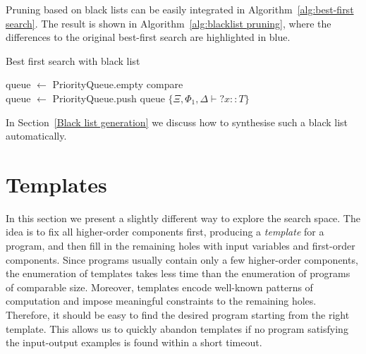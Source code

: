Pruning based on black lists can be easily integrated in Algorithm~\ref{alg:best-first search}. The result is shown in Algorithm~\ref{alg:blacklist pruning}, where the differences to the original best-first search are highlighted in blue.

\begin{algorithm}
\caption{Best first search with black list\label{alg:blacklist pruning}}

queue $\gets$ PriorityQueue.empty compare\\
queue $\gets$ PriorityQueue.push queue $\{\Xi, \Phi_1, \Delta \vdash {?x} :: T\}$\\

\end{algorithm}

In Section~\ref{Black list generation} we discuss how to synthesise such a black list automatically.

\section{Templates}\label{Templates}
In this section we present a slightly different way to explore the search space. The idea is to fix all higher-order components first, producing a \emph{template} for a program, and then fill in the remaining holes with input variables and first-order components. Since programs usually contain only a few higher-order components, the enumeration of templates takes less time than the enumeration of programs of comparable size. Moreover, templates encode well-known patterns of computation and impose meaningful constraints to the remaining holes. Therefore, it should be easy to find the desired program starting from the right template. This allows us to quickly abandon templates if no program satisfying the input-output examples is found within a short timeout.

